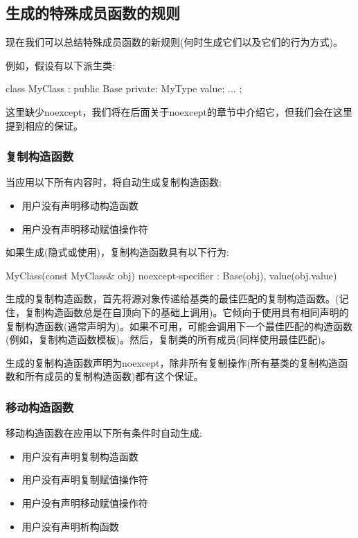 \subsection{生成的特殊成员函数的规则}

现在我们可以总结特殊成员函数的新规则(何时生成它们以及它们的行为方式)。

例如，假设有以下派生类:

\begin{cppcode}
class MyClass : public Base
{
private:
	MyType value;
	...
};
\end{cppcode}

这里缺少noexcept，我们将在后面关于noexcept的章节中介绍它，但我们会在这里提到相应的保证。

\subsubsection{复制构造函数}

当应用以下所有内容时，将自动生成复制构造函数:

\begin{itemize}
	\item 用户没有声明移动构造函数
	\item 用户没有声明移动赋值操作符
\end{itemize}

如果生成(隐式或使用)，复制构造函数具有以下行为:

\begin{cppcode}
MyClass(const MyClass& obj) noexcept-specifier
: Base(obj), value(obj.value) {
}
\end{cppcode}

生成的复制构造函数，首先将源对象传递给基类的最佳匹配的复制构造函数。(记住，复制构造函数总是在自顶向下的基础上调用)。它倾向于使用具有相同声明的复制构造函数(通常声明为)。如果不可用，可能会调用下一个最佳匹配的构造函数(例如，复制构造函数模板)。然后，复制类的所有成员(同样使用最佳匹配)。

生成的复制构造函数声明为noexcept，除非所有复制操作(所有基类的复制构造函数和所有成员的复制构造函数)都有这个保证。

\subsubsection{移动构造函数}

移动构造函数在应用以下所有条件时自动生成:

\begin{itemize}
	\item 用户没有声明复制构造函数
	\item 用户没有声明复制赋值操作符
	\item 用户没有声明移动赋值操作符
	\item 用户没有声明析构函数
\end{itemize}


